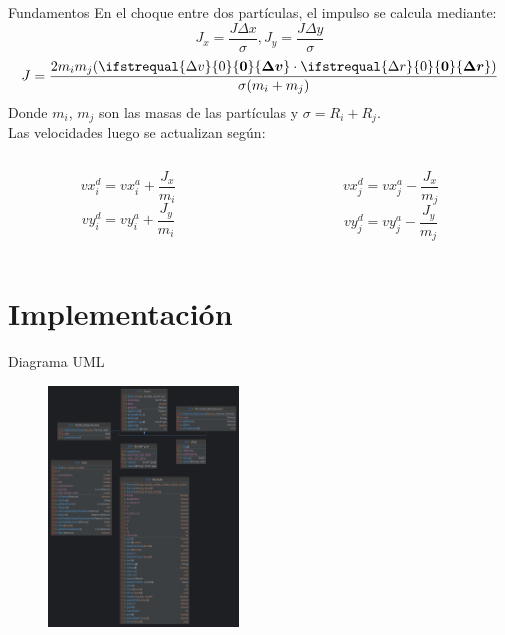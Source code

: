 \documentclass{beamer}
\renewcommand\vec[1]{\ifstrequal{#1}{0}{\ensuremath{\mathbf{0}}}{\ensuremath{\boldsymbol{#1}}}}
\begin{document}
\begin{frame}{Fundamentos}
    En el choque entre dos partículas, el impulso se calcula mediante: 
    \begin{equation*}
        J_x=\frac{J\Delta x}{\sigma}, J_y=\frac{J\Delta y}{\sigma}
    \end{equation*}
    \begin{equation*}
        J=\frac{2m_im_j(\vec{\Delta v}\cdot\vec{\Delta r})}{\sigma(m_i+m_j)}
    \end{equation*}
    Donde $m_i$, $m_j$ son las masas de las partículas y $\sigma=R_i+R_j$.\\
    Las velocidades luego se actualizan según:
    \begin{columns}[T,onlytextwidth]
        \begin{column}{0.50\textwidth}
            \begin{equation*}
                vx_i^d=vx_i^a+\frac{J_x}{m_i}
            \end{equation*}
            \begin{equation*}
                vy_i^d=vy_i^a+\frac{J_y}{m_i}
            \end{equation*}
        \end{column}
        \begin{column}{0.50\textwidth}
            \begin{equation*}
                vx_j^d=vx_j^a-\frac{J_x}{m_j}
            \end{equation*}
            \begin{equation*}
                vy_j^d=vy_j^a-\frac{J_y}{m_j}
            \end{equation*}
        \end{column}
    \end{columns}
\end{frame}

\section{Implementación}

\begin{frame}{Diagrama UML}
    \begin{figure}[htbp]
        \centering
        \includegraphics[width=0.45\textwidth]{resources/diagrama.png}
    \end{figure}
\end{frame}
\end{document}
